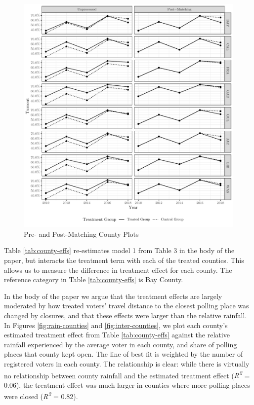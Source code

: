 \documentclass[
  12pt,
]{article}
\begin{document}
\begin{figure}[H]

{\centering \includegraphics{si_files/figure-latex/indcs-chunk-1} 

}

\caption{\label{fig:ind-counties}Pre- and Post-Matching County Plots}\label{fig:indcs-chunk}
\end{figure}

Table \ref{tab:county-effs} re-estimates model 1 from Table 3 in the body of the paper, but interacts the treatment term with each of the treated counties. This allows us to measure the difference in treatment effect for each county. The reference category in Table \ref{tab:county-effs} is Bay County.

\begin{singlespace}

\end{singlespace}

In the body of the paper we argue that the treatment effects are largely moderated by how treated voters' travel distance to the closest polling place was changed by closures, and that these effects were larger than the relative rainfall. In Figures \ref{fig:rain-counties} and \ref{fig:inter-counties}, we plot each county's estimated treatment effect from Table \ref{tab:county-effs} against the relative rainfall experienced by the average voter in each county, and share of polling places that county kept open. The line of best fit is weighted by the number of registered voters in each county. The relationship is clear: while there is virtually no relationship between county rainfall and the estimated treatment effect (\emph{R\textsuperscript{2}} = 0.06), the treatment effect was much larger in counties where more polling places were closed (\emph{R\textsuperscript{2}} = 0.82).
\end{document}
